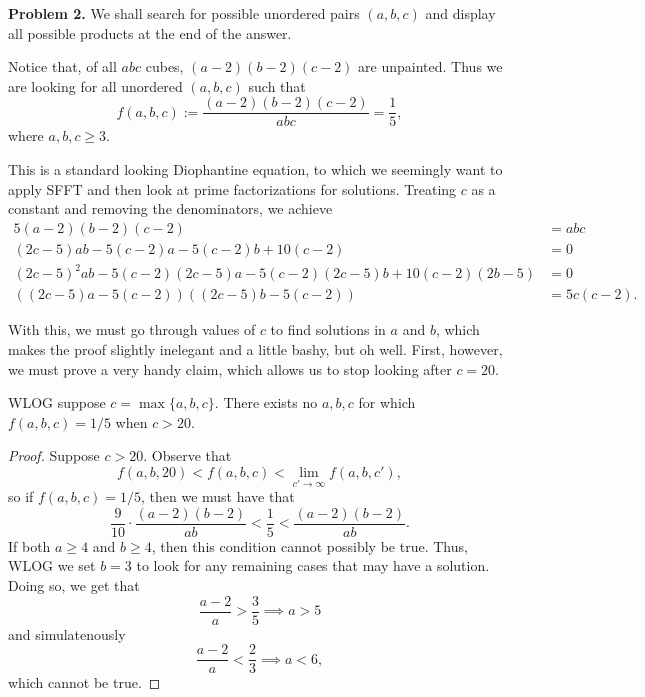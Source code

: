 \begin{solution}{2}
    \textbf{Problem 2.} We shall search for possible unordered pairs \( (a, b, c) \) and display all possible products at the end of the answer.

    Notice that, of all \( abc \) cubes, \( (a-2)(b-2)(c-2) \) are unpainted.
    Thus we are looking for all unordered \( (a, b, c) \) such that
    \[
        f(a, b, c) := \frac{(a-2)(b-2)(c-2)}{abc} = \frac{1}{5}
    ,\]
    where \( a, b, c \ge 3 \).

    This is a standard looking Diophantine equation, to which we seemingly want
    to apply SFFT and then look at prime factorizations for solutions. Treating
    \( c \) as a constant and removing the denominators, we achieve
    \begin{align*}
        5(a-2)(b-2)(c-2) &= abc \\
        (2c-5)ab - 5(c-2)a - 5(c-2)b + 10(c-2) &= 0 \\
        (2c-5)^2 ab - 5(c-2)(2c-5) a - 5(c - 2)(2c - 5)b + 10(c-2)(2b-5) &= 0 \\
        \left( (2c - 5)a - 5(c-2) \right)\left( (2c - 5)b - 5(c-2) \right) &= 5c(c-2)
    .\end{align*}

    With this, we must go through values of \( c \) to find solutions in \( a
    \) and \( b \), which makes the proof slightly inelegant and a little
    bashy, but oh well. First, however, we must prove a very handy claim, which allows us to stop looking after \( c = 20 \).
    \begin{claim}
        WLOG suppose \( c = \max\{a, b, c\} \). There exists no \( a, b, c \) for which \( f(a, b, c) = 1/5 \) when \( c > 20 \).
    \end{claim}
    \begin{proof}
        Suppose \( c > 20 \). Observe that
        \[
            f(a, b, 20) < f(a, b, c) < \lim_{c' \to \infty} f(a, b, c')
        ,\]
        so if \( f(a, b, c) = 1/5 \), then we must have that
        \[
            \frac{9}{10} \cdot \frac{(a-2)(b-2)}{ab} < \frac{1}{5} < \frac{(a-2)(b-2)}{ab}
        .\]
        If both \( a \ge 4 \) and \( b \ge 4 \), then this condition cannot possibly be true. Thus, WLOG we set \( b = 3 \) to look for any remaining cases that may have a solution. Doing so, we get that
        \[
            \frac{a-2}{a} > \frac{3}{5} \implies a > 5
        \]
        and simulatenously
        \[
            \frac{a-2}{a} < \frac{2}{3} \implies a < 6,
        \]
        which cannot be true.


\end{proof}
\end{solution}
